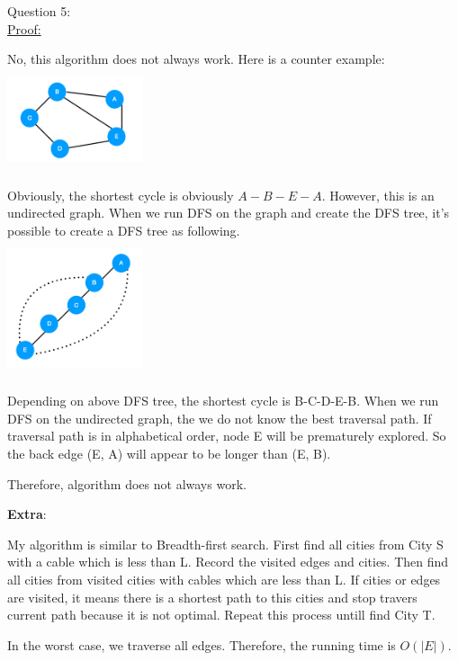 \documentclass[12pt]{article}
\begin{document}
\pagebreak
\large Question 5: \vspace{5mm}\\
\normalsize 
\setlength{\baselineskip}{8mm}
\underline{Proof:} \par
No, this algorithm does not always work. Here is a counter example: \\
\includegraphics[width=4cm, height=3cm]{undriect} \par
Obviously, the shortest cycle is obviously $A-B-E-A$. However, this is an undirected graph. When we run DFS on the graph and create the DFS tree, it's possible to create a DFS tree as following. \\
\includegraphics[width=4cm, height=4cm]{tree} \par
Depending on above DFS tree, the shortest cycle is B-C-D-E-B. When we run DFS on the undirected graph, the we do not know the best traversal path. 
If traversal path is in alphabetical order, node E will be prematurely explored. So the back edge (E, A) will appear to be longer than (E, B). \par
Therefore, algorithm does not always work.




\pagebreak
\large \textbf{Extra}:\\ \vspace{5mm}\par
\normalsize 
\setlength{\baselineskip}{8mm}
My algorithm is similar to Breadth-first search. First find all cities from City S with a cable which is less than L. Record the visited edges and cities. 
Then find all cities from visited cities with cables which are less than L. 
If cities or edges are visited, it means there is a shortest path to this cities and stop travers current path because it is not optimal.
Repeat this process untill find City T. \par
In the worst case, we traverse all edges. Therefore, the running time is $O(|E|)$.





 
\end{document}
